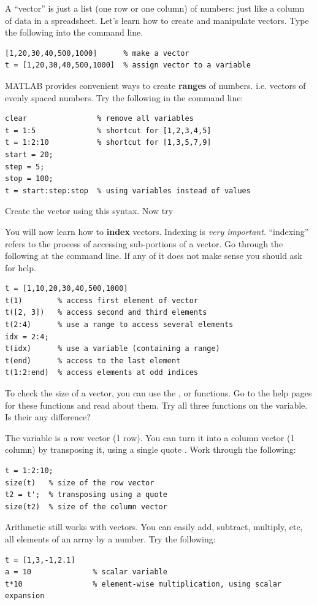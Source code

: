 \documentclass{article}
\begin{document}
A ``vector'' is just a list (one row or one column) of numbers: just like a column of data in a spreadsheet.
Let's learn how to create and manipulate vectors.
Type the following into the command line.
\begin{lstlisting}
[1,20,30,40,500,1000]      % make a vector
t = [1,20,30,40,500,1000]  % assign vector to a variable
\end{lstlisting}

MATLAB provides convenient ways to create \textbf{ranges} of numbers. i.e. vectors of evenly spaced numbers.
Try the following in the command line:
\begin{lstlisting}
clear                % remove all variables
t = 1:5              % shortcut for [1,2,3,4,5]
t = 1:2:10           % shortcut for [1,3,5,7,9]
start = 20;
step = 5;
stop = 100;
t = start:step:stop  % using variables instead of values
\end{lstlisting}
Create the vector \mcode{[5,8,11,14]} using this syntax. Now try \mcode{[-1,-2,-3,-4]}

You will now learn how to \textbf{index} vectors.
Indexing is \emph{very important}.
``indexing'' refers to the process of accessing sub-portions of a vector.
Go through the following at the command line.
If any of it does not make sense you should ask for help.
\begin{lstlisting}
t = [1,10,20,30,40,500,1000]
t(1)        % access first element of vector
t([2, 3])   % access second and third elements
t(2:4)      % use a range to access several elements
idx = 2:4;
t(idx)      % use a variable (containing a range)
t(end)      % access to the last element
t(1:2:end)  % access elements at odd indices
\end{lstlisting}

To check the size of a vector, you can use the ,  or  functions.
Go to the help pages for these functions and read about them. 
Try all three functions on the  variable. Is their any difference?

\pagebreak
The variable  is a row vector (1 row).
You can turn it into a column vector (1 column) by transposing it, using a single quote .
Work through the following:
\begin{lstlisting}
t = 1:2:10;
size(t)   % size of the row vector
t2 = t';  % transposing using a quote
size(t2)  % size of the column vector
\end{lstlisting}

Arithmetic still works with vectors.
You can easily add, subtract, multiply, etc, all elements of an array by a number.
Try the following:
\begin{lstlisting}
t = [1,3,-1,2.1]
a = 10              % scalar variable
t*10                % element-wise multiplication, using scalar expansion
\end{lstlisting}
\end{document}
